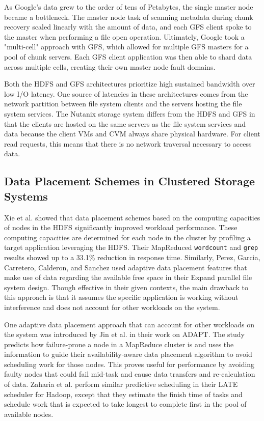 \documentclass[12pt]{article}
\begin{document}
  As Google's data grew to the order of tens of Petabytes, the single master
  node became a bottleneck. The master node task of scanning metadata during
  chunk recovery scaled linearly with the amount of data, and each GFS client
  spoke to the master when performing a file open operation. Ultimately, Google
  took a "multi-cell" approach with GFS, which allowed for multiple GFS masters
  for a pool of chunk servers. Each GFS client application was then able to
  shard data across multiple cells, creating their own master node fault
  domains.

  Both the HDFS and GFS architectures prioritize high sustained bandwidth over
  low I/O latency. One source of latencies in these architectures comes from
  the network partition between file system clients and the servers hosting the
  file system services. The Nutanix storage system differs from the HDFS and
  GFS in that the clients are hosted on the same servers as the file system
  services and data because the client VMs and CVM always share physical
  hardware. For client read requests, this means that there is no network
  traversal necessary to access data.

  \subsection{Data Placement Schemes in Clustered Storage Systems}
  \label{sec:priorwork}

  Xie et al. \cite{xie2010} showed that data placement schemes based on the
  computing capacities of nodes in the HDFS significantly improved workload
  performance. These computing capacities are determined for each node in the
  cluster by profiling a target application leveraging the HDFS. Their
  MapReduced \texttt{wordcount} and \texttt{grep} results showed up to a 33.1\%
  reduction in response time. Similarly, Perez, Garcia, Carretero, Calderon,
  and Sanchez \cite{perez2003} used adaptive data placement features that make
  use of data regarding the available free space in their Expand parallel file
  system design.  Though effective in their given contexts, the main drawback
  to this approach is that it assumes the specific application is working
  without interference and does not account for other workloads on the system.

  One adaptive data placement approach that can account for other workloads on
  the system was introduced by Jin et al. \cite{adapt2012} in their work on
  ADAPT. The study predicts how failure-prone a node in a MapReduce cluster is
  and uses the information to guide their availability-aware data placement
  algorithm to avoid scheduling work for those nodes. This proves useful for
  performance by avoiding faulty nodes that could fail mid-task and cause data
  transfers and re-calculation of data. Zaharia et al. \cite{zaharia2008}
  perform similar predictive scheduling in their LATE scheduler for Hadoop,
  except that they estimate the finish time of tasks and schedule work that
  is expected to take longest to complete first in the pool of available
  nodes.
\end{document}
